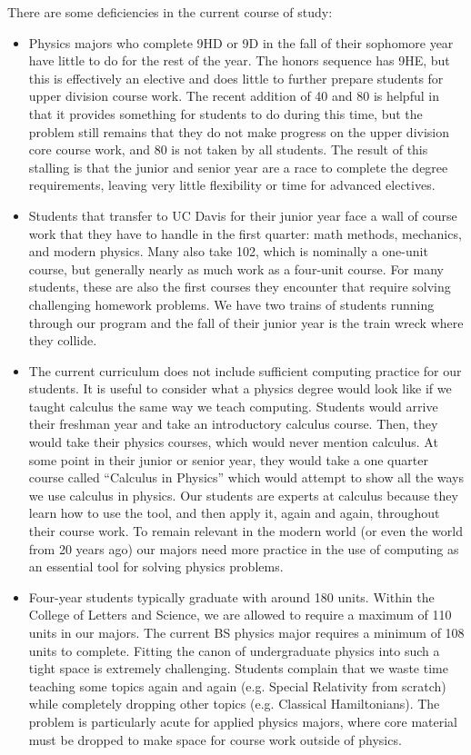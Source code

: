 \documentclass[12pt]{article}
\begin{document}
There are some deficiencies in the current course of study:
\begin{itemize}
\item Physics majors who complete 9HD or 9D in the fall of their
  sophomore year have little to do for the rest of the year.  The
  honors sequence has 9HE, but this is effectively an elective and
  does little to further prepare students for upper division
  course work.  The recent addition of 40 and 80 is helpful in that it
  provides something for students to do during this time, but the
  problem still remains that they do not make progress on the upper
  division core course work, and 80 is not taken by all students.  The
  result of this stalling is that the junior and senior year are a
  race to complete the degree requirements, leaving very little
  flexibility or time for advanced electives.

\item Students that transfer to UC Davis for their junior year face a
  wall of course work that they have to handle in the first quarter:
  math methods, mechanics, and modern physics.  Many also take 102,
  which is nominally a one-unit course, but generally nearly as much
  work as a four-unit course.  For many students, these are also the
  first courses they encounter that require solving challenging
  homework problems.  We have two trains of students running through
  our program and the fall of their junior year is the train wreck
  where they collide.

\item The current curriculum does not include sufficient computing
  practice for our students.  It is useful to consider what a physics
  degree would look like if we taught calculus the same way we teach
  computing.  Students would arrive their freshman year and take an
  introductory calculus course.  Then, they would take their physics
  courses, which would never mention calculus.  At some point in their
  junior or senior year, they would take a one quarter course called
  ``Calculus in Physics'' which would attempt to show all the ways we
  use calculus in physics.  Our students are experts at calculus
  because they learn how to use the tool, and then apply it, again and
  again, throughout their course work.  To remain relevant in the
  modern world (or even the world from 20 years ago) our majors need
  more practice in the use of computing as an essential tool for
  solving physics problems.

\item Four-year students typically graduate with around 180 units.
  Within the College of Letters and Science, we are allowed to require
  a maximum of 110 units in our majors.  The current BS physics major
  requires a minimum of 108 units to complete.  Fitting the canon of
  undergraduate physics into such a tight space is extremely
  challenging.  Students complain that we waste time teaching some
  topics again and again (e.g. Special Relativity from scratch) while
  completely dropping other topics (e.g. Classical Hamiltonians).  The
  problem is particularly acute for applied physics majors, where core
  material must be dropped to make space for course work outside of
  physics.


\end{itemize}
\end{document}
